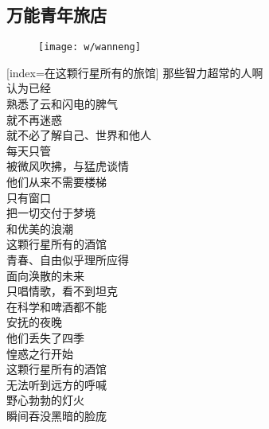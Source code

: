 
	

\subsection{万能青年旅店}

\begin{figure}[htp]
	\begin{center}
	  \texttt{[image: w/wanneng]}
	  \label{fig:wanneng}
	\end{center}
\end{figure}

\begin{songs}{}
  [index={在这颗行星所有的旅馆}]
  那些智力超常的人啊	\\
  认为已经 	\\
  熟悉了云和闪电的脾气	\\
  就不再迷惑 	\\
  就不必了解自己、世界和他人	\\
  每天只管 \\
  被微风吹拂，与猛虎谈情	\\
  \vspace{2ex}
  他们从来不需要楼梯	\\
  只有窗口 	\\
  把一切交付于梦境	\\
  和优美的浪潮 	\\
  这颗行星所有的酒馆 	\\
  青春、自由似乎理所应得 	\\
  面向涣散的未来 	\\
  只唱情歌，看不到坦克	\\
  \vspace{2ex}
  在科学和啤酒都不能	\\
  安抚的夜晚 	\\
  他们丢失了四季 \\
  惶惑之行开始 \\
  这颗行星所有的酒馆	\\
  无法听到远方的呼喊 	\\
  野心勃勃的灯火 	\\
  瞬间吞没黑暗的脸庞	\\
  \endsong
\end{songs}

	

